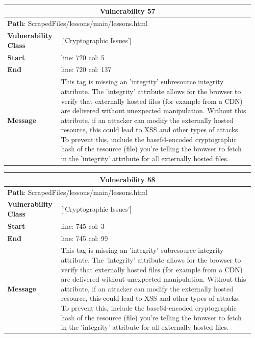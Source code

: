 \documentclass[12pt]{article}
\begin{document}
\vspace{0.7cm}
\FloatBarrier
\begin{table}[!h]
\centering
\renewcommand{\arraystretch}{1.3}
\begin{tabular}{|l|p{10cm}|}
\hline
\multicolumn{2}{|c|}{\textbf{Vulnerability 57}} \\
\hline
\multicolumn{2}{|l|}{\textbf{Path}: ScrapedFiles/lessons/main/lessons.html} \\
\hline
\textbf{Vulnerability Class} & ['Cryptographic Issues'] \\
\hline
\textbf{Start} & line: 720 \quad col: 5 \\
\hline
\textbf{End} & line: 720 \quad col: 137 \\
\hline
\textbf{Message} & This tag is missing an 'integrity' subresource integrity attribute. The 'integrity' attribute allows for the browser to verify that externally hosted files (for example from a CDN) are delivered without unexpected manipulation. Without this attribute, if an attacker can modify the externally hosted resource, this could lead to XSS and other types of attacks. To prevent this, include the base64-encoded cryptographic hash of the resource (file) you're telling the browser to fetch in the 'integrity' attribute for all externally hosted files. \\
\hline
\end{tabular}
\end{table}
\vspace{0.7cm}
\FloatBarrier
\begin{table}[!h]
\centering
\renewcommand{\arraystretch}{1.3}
\begin{tabular}{|l|p{10cm}|}
\hline
\multicolumn{2}{|c|}{\textbf{Vulnerability 58}} \\
\hline
\multicolumn{2}{|l|}{\textbf{Path}: ScrapedFiles/lessons/main/lessons.html} \\
\hline
\textbf{Vulnerability Class} & ['Cryptographic Issues'] \\
\hline
\textbf{Start} & line: 745 \quad col: 3 \\
\hline
\textbf{End} & line: 745 \quad col: 99 \\
\hline
\textbf{Message} & This tag is missing an 'integrity' subresource integrity attribute. The 'integrity' attribute allows for the browser to verify that externally hosted files (for example from a CDN) are delivered without unexpected manipulation. Without this attribute, if an attacker can modify the externally hosted resource, this could lead to XSS and other types of attacks. To prevent this, include the base64-encoded cryptographic hash of the resource (file) you're telling the browser to fetch in the 'integrity' attribute for all externally hosted files. \\
\hline
\end{tabular}
\end{table}
\end{document}
